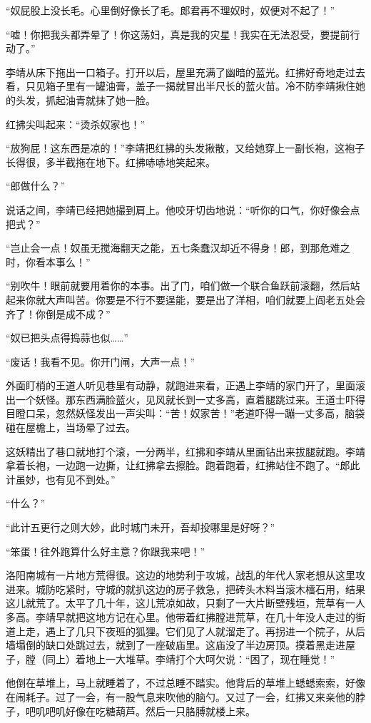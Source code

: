 “奴屁股上没长毛。心里倒好像长了毛。郎君再不理奴时，奴便对不起了！”

“嘘！你把我头都弄晕了！你这荡妇，真是我的灾星！我实在无法忍受，要提前行动了。”

李靖从床下拖出一口箱子。打开以后，屋里充满了幽暗的蓝光。红拂好奇地走过去看，只见箱子里有一罐油膏，盖子一揭就冒出半尺长的蓝火苗。冷不防李靖揪住她的头发，抓起油青就抹了她一脸。

红拂尖叫起来：“烫杀奴家也！”

“放狗屁！这东西是凉的！”李靖把红拂的头发揪散，又给她穿上一副长袍，这袍子长得很，多半截拖在地下。红拂哧哧地笑起来。

“郎做什么？”

说话之间，李靖已经把她撮到肩上。他咬牙切齿地说：“听你的口气，你好像会点把式？”

“岂止会一点！奴虽无搅海翻天之能，五七条蠢汉却近不得身！郎，到那危难之时，你看本事么！”

“别吹牛！眼前就要用着你的本事。出了门，咱们做一个联合鱼跃前滚翻，然后站起来你就大声叫苦。你要是不行不要逞能，要是出了洋相，咱们就要上阎老五处会齐了！你倒是成不成？”

“奴已把头点得捣蒜也似……”

“废话！我看不见。你开门闸，大声一点！”

外面盯梢的王道人听见巷里有动静，就跑进来看，正遇上李靖的家门开了，里面滚出一个妖怪。那东西满脸蓝火，见风就长到一丈多高，直着腿跳过来。王道士吓得目瞪口呆，忽然妖怪发出一声尖叫：“苦！奴家苦！”老道吓得一蹦一丈多高，脑袋碰在屋檐上，当场晕了过去。

这妖精出了巷口就地打个滚，一分两半，红拂和李靖从里面钻出来拔腿就跑。李靖拿着长袍，一边跑一边撕，让红拂拿去擦脸。跑着跑着，红拂站住不跑了。“郎此计虽妙，也有见不到处。”

“什么？”

“此计五更行之则大妙，此时城门未开，吾却投哪里是好呀？”

“笨蛋！往外跑算什么好主意？你跟我来吧！”

洛阳南城有一片地方荒得很。这边的地势利于攻城，战乱的年代人家老想从这里攻进来。城防吃紧时，守城的就扒这边的房子救急，把砖头木料当滚木檑石用，结果这儿就荒了。太平了几十年，这儿荒凉如故，只剩了一大片断壁残垣，荒草有一人多高。李靖早就把这地方记在心里。他带着红拂膛进荒草，在几十年没人走过的街道上走，遇上了几只下夜班的狐狸。它们见了人就溜走了。再拐进一个院子，从后墙塌倒的缺口处跳过去，就到了一座破庙里。这庙没了半边房顶。摸着黑走进屋子，膛（同上）着地上一大堆草。李靖打个大呵欠说：“困了，现在睡觉！”

他倒在草堆上，马上就睡着了，不过总睡不踏实。他背后的草堆上蟋蟋索索，好像在闹耗子。过了一会，有一股气息来吹他的脑勺。又过了一会，红拂又来亲他的脖子，吧叽吧叽好像在吃糖葫芦。然后一只胳膊就楼上来。

